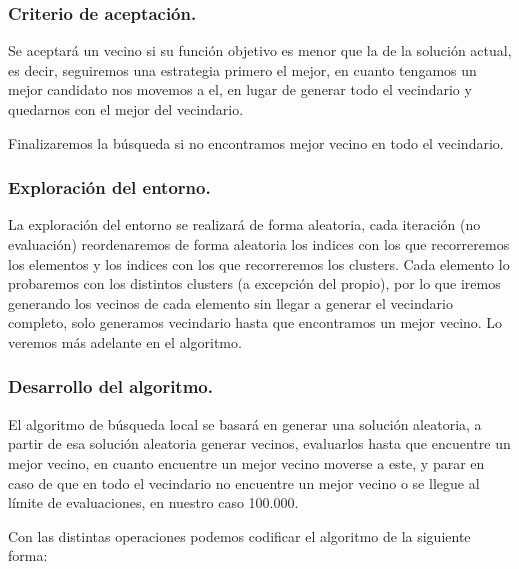 \documentclass[12pt, spanish]{article}
\begin{document}
\subsubsection{Criterio de aceptación.}

Se aceptará un vecino si su función objetivo es menor que la de la solución actual, es decir, seguiremos una estrategia primero el mejor, en cuanto tengamos un mejor candidato nos movemos a el, en lugar de generar todo el vecindario y quedarnos con el mejor del vecindario.

Finalizaremos la búsqueda si no encontramos mejor vecino en todo el vecindario.

\subsubsection{Exploración del entorno.}

La exploración del entorno se realizará de forma aleatoria, cada iteración (no evaluación) reordenaremos de forma aleatoria los indices con los que recorreremos los elementos y los indices con los que recorreremos los clusters. Cada elemento lo probaremos con los distintos clusters (a excepción del propio), por lo que iremos generando los vecinos de cada elemento sin llegar a generar el vecindario completo, solo generamos vecindario hasta que encontramos un mejor vecino. Lo veremos más adelante en el algoritmo.

\subsubsection{Desarrollo del algoritmo.}

El algoritmo de búsqueda local se basará en generar una solución aleatoria, a partir de esa solución aleatoria generar vecinos, evaluarlos hasta que encuentre un mejor vecino, en cuanto encuentre un mejor vecino moverse a este, y parar en caso de que en todo el vecindario no encuentre un mejor vecino o se llegue al límite de evaluaciones, en nuestro caso 100.000.

\newpage

Con las distintas operaciones podemos codificar el algoritmo de la siguiente forma:
\end{document}

